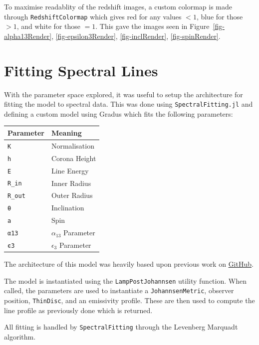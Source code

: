 \documentclass[
  letterpaper,
  DIV=11,
  numbers=noendperiod]{scrreprt}
\newcounter{none} %
\begin{document}
To maximise readablity of the redshift images, a custom colormap is made
through \texttt{RedshiftColormap} which gives red for any values \(<1\),
blue for those \(>1\), and white for those \(=1\). This gave the images
seen in
Figure~\ref{fig-alpha13Render}, \ref{fig-epsilon3Render}, \ref{fig-inclRender}, \ref{fig-spinRender}.


\chapter{Fitting Spectral Lines}\label{fitting-spectral-lines}

With the parameter space explored, it was useful to setup the
architecture for fitting the model to spectral data. This was done using
\texttt{SpectralFitting.jl} and defining a custom model using Gradus
which fits the following parameters:

{\def\LTcaptype{none} %
\begin{longtable}[]{@{}ll@{}}
\toprule\noalign{}
Parameter & Meaning \\
\midrule\noalign{}
\endhead
\bottomrule\noalign{}
\endlastfoot
\texttt{K} & Normalisation \\
\texttt{h} & Corona Height \\
\texttt{E} & Line Energy \\
\texttt{R\_in} & Inner Radius \\
\texttt{R\_out} & Outer Radius \\
\texttt{θ} & Inclination \\
\texttt{a} & Spin \\
\texttt{α13} & \(\alpha_{13}\) Parameter \\
\texttt{ϵ3} & \(\epsilon_{3}\) Parameter \\
\end{longtable}
}

The architecture of this model was heavily based upon previous work on
\href{https://github.com/phajy/DiscAbsorption/blob/main/gradus-lamp-post.jl}{GitHub}.

The model is instantiated using the \texttt{LampPostJohannsen} utility
function. When called, the parameters are used to instantiate a
\texttt{JohannsenMetric}, observer position, \texttt{ThinDisc}, and an
emissivity profile. These are then used to compute the line profile as
previously done which is returned.

All fitting is handled by \texttt{SpectralFitting} through the Levenberg
Marquadt algorithm.
\end{document}
